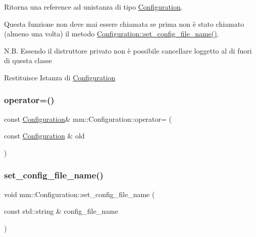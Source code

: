 Ritorna una reference ad un\textquotesingle{}istanza di tipo {\ttfamily \mbox{\hyperlink{classmm_1_1_configuration}{Configuration}}}. 

Questa funzione non deve mai essere chiamata se prima non è stato chiamato (almeno una volta) il metodo \mbox{\hyperlink{classmm_1_1_configuration_ad526b28d1a7f8c6f854352b840d2d7b4}{Configuration\+::set\+\_\+config\+\_\+file\+\_\+name()}}.

N.\+B. Essendo il distruttore privato non è possibile cancellare l\textquotesingle{}oggetto al di fuori di questa classe

\begin{DoxyReturn}{Restituisce}
Istanza di \mbox{\hyperlink{classmm_1_1_configuration}{Configuration}} 
\end{DoxyReturn}
\mbox{\label{classmm_1_1_configuration_a3077aebf459758dce4be716a8ddcb090}} 
\subsubsection{\texorpdfstring{operator=()}{operator=()}}
{\footnotesize\ttfamily const \mbox{\hyperlink{classmm_1_1_configuration}{Configuration}}\& mm\+::\+Configuration\+::operator= (\begin{DoxyParamCaption}\item[{const \mbox{\hyperlink{classmm_1_1_configuration}{Configuration}} \&}]{old }\end{DoxyParamCaption})\hspace{0.3cm}{\ttfamily [delete]}}

\mbox{\label{classmm_1_1_configuration_ad526b28d1a7f8c6f854352b840d2d7b4}} 
\subsubsection{\texorpdfstring{set\+\_\+config\+\_\+file\+\_\+name()}{set\_config\_file\_name()}}
{\footnotesize\ttfamily void mm\+::\+Configuration\+::set\+\_\+config\+\_\+file\+\_\+name (\begin{DoxyParamCaption}\item[{const std\+::string \&}]{config\+\_\+file\+\_\+name }\end{DoxyParamCaption})\hspace{0.3cm}{\ttfamily [static]}}



